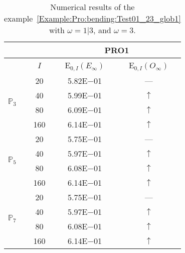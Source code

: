\begin{table}[H]
\caption{Numerical results of the example~\ref{Example:Pro:bending:Test01_23_glob1} with $\omega=1|3$, and $\omega=3$.}
\setlength{\tabcolsep}{5pt}
\centering
\begin{tabular}{@{}l c c c@{}}
\toprule
 &  & \multicolumn{2}{c}{PRO1}\\
\midrule
 & $I$ & E$_{0,I}(E_{\infty})$ & E$_{0,I}(O_{\infty})$\\
\midrule
\multirow{4}{*}{$\mathbb{P}_{3}$} & 20 & 5.82E$-$01 & ---\\
 & 40 & 5.99E$-$01 & $\uparrow$\\
 & 80 & 6.09E$-$01 & $\uparrow$\\
 & 160 & 6.14E$-$01 & $\uparrow$\\
\midrule
\multirow{4}{*}{$\mathbb{P}_{5}$} & 20 & 5.75E$-$01 & ---\\
 & 40 & 5.97E$-$01 & $\uparrow$\\
 & 80 & 6.08E$-$01 & $\uparrow$\\
 & 160 & 6.14E$-$01 & $\uparrow$\\
\midrule
\multirow{4}{*}{$\mathbb{P}_{7}$} & 20 & 5.75E$-$01 & ---\\
 & 40 & 5.97E$-$01 & $\uparrow$\\
 & 80 & 6.08E$-$01 & $\uparrow$\\
 & 160 & 6.14E$-$01 & $\uparrow$\\
\bottomrule
\end{tabular}
\label{Table:PRO:test_01_23_test3}
\end{table}
